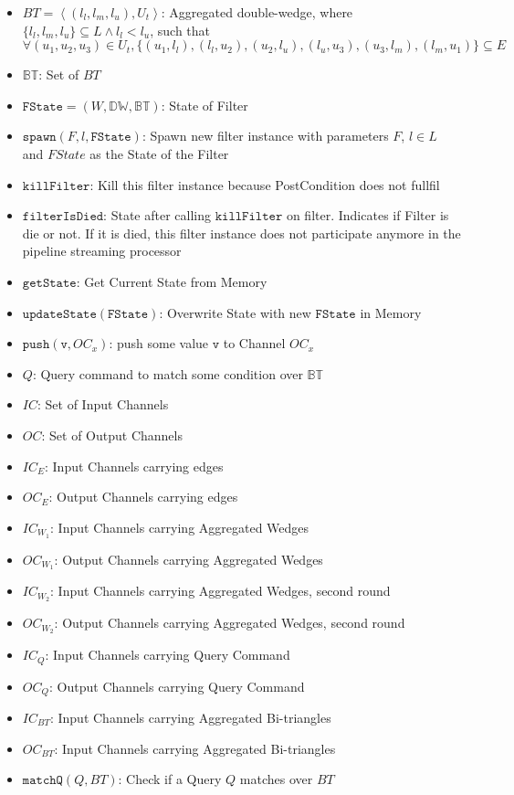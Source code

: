 \documentclass[12pt, a4paper]{article}
\newcommand{\dw}{\mathbb{DW}}
\newcommand{\bt}{\mathbb{BT}}
\newcommand{\st}{\mathtt{FState}}
\newcommand{\sw}{\mathtt{spawn}}
\newcommand{\fd}{\mathtt{killFilter}}
\newcommand{\fid}{\mathtt{filterIsDied}}
\newcommand{\us}{\mathtt{updateState}}
\newcommand{\gs}{\mathtt{getState}}
\newcommand{\p}{\mathtt{push}}
\newcommand{\mt}{\mathtt{matchQ}}
\newcommand{\la}{\left\langle}
\newcommand{\ra}{\right\rangle}
\begin{document}
\begin{itemize}
      \item $BT = \la (l_l, l_m, l_u), U_t \ra$: Aggregated double-wedge, where $\{l_l, l_m, l_u\} \subseteq L \land l_l < l_u$, such that \\
       $\forall (u_1, u_2, u_3) \in U_t, \{(u_1, l_l), (l_l, u_2), (u_2, l_u), (l_u, u_3), (u_3, l_m), (l_m, u_1)\} \subseteq E$
      \item $\bt$: Set of $BT$
      \item $\st = (W, \dw, \bt)$: State of Filter
      \item $\sw(F,l,\st)$: Spawn new filter instance with parameters $F$, $l \in L$ and $FState$ as the State of the Filter
      \item $\fd$: Kill this filter instance because PostCondition does not fullfil
      \item $\fid$: State after calling $\fd$ on filter. Indicates if Filter is die or not. If it is died, this filter instance does not participate anymore in the pipeline streaming processor
      \item $\gs$: Get Current State from Memory
      \item $\us(\st)$: Overwrite State with new $\st$ in Memory
      \item $\p(\mathtt{v}, OC_x)$: push some value $\mathtt{v}$ to Channel $OC_x$
      \item $Q$: Query command to match some condition over $\bt$
      \item $IC$: Set of Input Channels
      \item $OC$: Set of Output Channels    
      \item $IC_E$: Input Channels carrying edges
      \item $OC_E$: Output Channels carrying edges
      \item $IC_{W_1}$: Input Channels carrying Aggregated Wedges
      \item $OC_{W_1}$: Output Channels carrying Aggregated Wedges
      \item $IC_{W_2}$: Input Channels carrying Aggregated Wedges, second round
      \item $OC_{W_2}$: Output Channels carrying Aggregated Wedges, second round
      \item $IC_Q$: Input Channels carrying Query Command
      \item $OC_Q$: Output Channels carrying Query Command
      \item $IC_{BT}$: Input Channels carrying Aggregated Bi-triangles 
      \item $OC_{BT}$: Input Channels carrying Aggregated Bi-triangles 
      \item $\mt(Q, BT)$: Check if a Query $Q$ matches over $BT$ 
\end{itemize}
\end{document}
